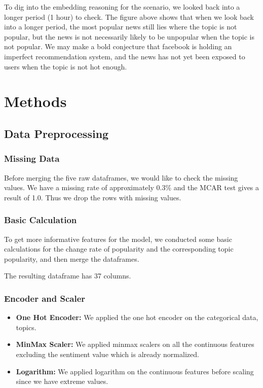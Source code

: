 \documentclass{article}
\begin{document}
To dig into the embedding reasoning for the scenario, we looked back into a longer period (1 hour) to check. The figure above shows that when we look back into a longer period, the most popular news still lies where the topic is not popular, but the news is not necessarily likely to be unpopular when the topic is not popular. We may make a bold conjecture that facebook is holding an imperfect recommendation system, and the news has not yet been exposed to users when the topic is not hot enough. 
\newpage
\section{Methods}
\subsection{Data Preprocessing}

\subsubsection{Missing Data}
Before merging the five raw dataframes, we would like to check the missing values. We have a missing rate of approximately 0.3\% and the MCAR test gives a result of 1.0. Thus we drop the rows with missing values.
\subsubsection{Basic Calculation}
To get more informative features for the model, we conducted some basic calculations for the change rate of popularity and the corresponding topic popularity, and then merge the dataframes.\par
The resulting dataframe has 37 columns.

\subsubsection{Encoder and Scaler}

\begin{itemize}
\item \textbf{One Hot Encoder: }
We applied the one hot encoder on the categorical data, topics.
\item \textbf{MinMax Scaler: }
We applied minmax scalers on all the continuous features excluding the sentiment value which is already normalized.
\item \textbf{Logarithm: }
We applied logarithm on the continuous features before scaling since we have extreme values.

\end{itemize}
\end{document}

